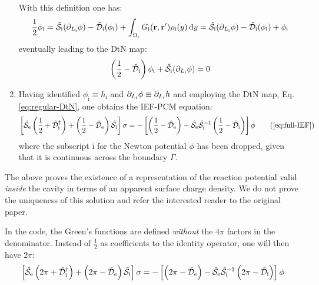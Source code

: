 \begin{enumerate}
    With this definition one has:
    \begin{equation}
      \frac{1}{2}\phi_\mathrm{i} =
      \hat{\mathcal{S}}_\mathrm{i}(\partial_{L_\mathrm{i}} \phi) -
      \hat{\mathcal{D}}_\mathrm{i}(\phi_\mathrm{i}) + \int_{\Omega_\mathrm{i}}G_\mathrm{i}(\mathbf{r}, \mathbf{r}^\prime)\rho_\mathrm{i}(y)\mathop{}\!\mathrm{d} y
      =
      \hat{\mathcal{S}}_\mathrm{i}(\partial_{L_\mathrm{i}} \phi) -
      \hat{\mathcal{D}}_\mathrm{i}(\phi_\mathrm{i}) + \phi_\mathrm{i}
    \end{equation}
    eventually leading to the \acs{DtN} map:
    \begin{equation}\label{eq:regular-DtN}
      \left(\frac{1}{2} - \hat{\mathcal{D}}_\mathrm{i}\right)\phi_\mathrm{i}
      +\hat{\mathcal{S}}_\mathrm{i}(\partial_{L_\mathrm{i}} \phi) = 0
    \end{equation}
  \item Having identified $\phi_\mathrm{i} \equiv h_\mathrm{i}$
    and $\partial_{L_\mathrm{i}} \phi \equiv \partial_{L_\mathrm{i}} h$ and employing the \acs{DtN} map,
    Eq.\eqref{eq:regular-DtN}, one obtains the \acs{IEF}-\acs{PCM} equation:
    \begin{equation}
      \left[ \bi{S}_\mathrm{e}\left(\frac{1}{2} + \bi{D}^\dagger_\mathrm{i}\right)
      +
      \left(\frac{1}{2} - \bi{D}_\mathrm{e}\right)\bi{S}_\mathrm{i}
      \right]\sigma =
      -\left[\left(\frac{1}{2}-\bi{D}_\mathrm{e}\right)
      -\bi{S}_\mathrm{e}\bi{S}_\mathrm{i}^{-1}
       \left(\frac{1}{2}-\bi{D}_\mathrm{i}\right)
      \right]\phi
  \tag{\ref{eq:full-IEF}}
    \end{equation}
    where the subscript $\mathrm{i}$ for the Newton potential $\phi$ has
    been dropped, given that it is continuous across the boundary
    $\Gamma$.
\end{enumerate}
The above proves the existence of a representation of the reaction
potential valid \emph{inside} the cavity in terms of an apparent surface
charge density. We do not prove the uniqueness of this solution and
refer the interested reader to the original
paper.~\autocite{Cances1998-og}

In the code, the Green's functions are defined \emph{without} the $4\pi$
factors in the denominator. Instead of $\frac{1}{2}$ as coefficients to
the identity operator, one will then have $2\pi$:
\begin{equation}\label{eq:full-IEF-2pi}
  \left[ \hat{\mathcal{S}}_\mathrm{e}\left(2\pi + \hat{\mathcal{D}}^\dagger_\mathrm{i}\right)
  +
  \left(2\pi - \hat{\mathcal{D}}_\mathrm{e}\right)\hat{\mathcal{S}}_\mathrm{i}
  \right]\sigma =
  -\left[\left(2\pi-\hat{\mathcal{D}}_\mathrm{e}\right)
  -\hat{\mathcal{S}}_\mathrm{e}\hat{\mathcal{S}}_\mathrm{i}^{-1}
  \left(2\pi-\hat{\mathcal{D}}_\mathrm{i}\right)
  \right]\phi
\end{equation}

